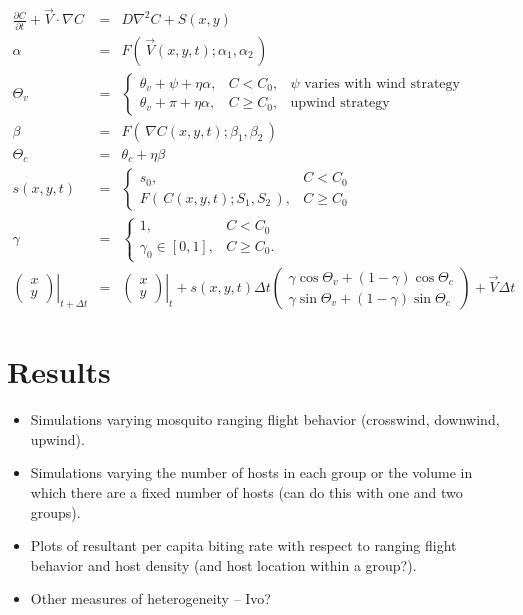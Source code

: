 \documentclass[12pt]{article}
\begin{document}
		\begin{eqnarray*}
			\frac{\partial C}{\partial t} + {\vec V}\cdot\nabla C &=& D\nabla^2 C + S(x,y) \\
			\alpha &=& F(\,\vec V(x,y,t);\alpha_1,\alpha_2\,) \\
			\Theta_v &=&  \left\{\begin{matrix}\theta_v + \psi + \eta\alpha, & C < C_0, & \text{$\psi$ varies with wind strategy} \\  \theta_v + \pi + \eta\alpha, & C \geq C_0, & \text{upwind strategy} \qquad \end{matrix}\right. \\ 
			\beta &=& F(\, \nabla C(x,y,t);\beta_1,\beta_2\,) \\
			\Theta_c &=&  \theta_c + \eta\beta \\
			s(x,y,t) &=&   \left\{\begin{matrix} s_0, & C < C_0 \\ F(\,C(x,y,t);S_1,S_2\,), & C \geq C_0 \end{matrix} \right.\\
			\gamma &=&  \left\{\begin{matrix} 1, & C < C_0 \\ \gamma_0 \in [0,1], & C \geq C_0 .\end{matrix} \right. \\
			\left.\begin{pmatrix} x \\ y \end{pmatrix}\right\vert_{t+\Delta t} &=& \left.\begin{pmatrix} x \\ y \end{pmatrix}\right\vert_{t} + s(x,y,t) \Delta t \begin{pmatrix} \gamma\cos\Theta_v + (1-\gamma)\cos\Theta_c \\ \gamma\sin\Theta_v + (1-\gamma)\sin\Theta_c \end{pmatrix} + \vec V \Delta t
		\end{eqnarray*}
			
	


	\section{Results}
	\begin{itemize}
		\item Simulations varying mosquito ranging flight behavior (crosswind, downwind, upwind).
		\item Simulations varying the number of hosts in each group or the volume in which there are a fixed number of hosts (can do this with one and two groups).
		\item Plots of resultant per capita biting rate with respect to ranging flight behavior and host density (and host location within a group?).
		\item Other measures of heterogeneity -- Ivo?
	\end{itemize}
\end{document}
